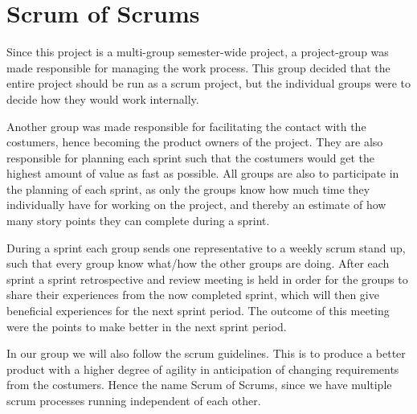 \section{Scrum of Scrums}
Since this project is a multi-group semester-wide project, a project-group was made responsible for managing the work process.
This group decided that the entire project should be run as a scrum project, but the individual groups were to decide how they would work internally.

Another group was made responsible for facilitating the contact with the costumers, hence becoming the product owners of the project.
They are also responsible for planning each sprint such that the costumers would get the highest amount of value as fast as possible.
All groups are also to participate in the planning of each sprint, as only the groups know how much time they individually have for working on the project, and thereby an estimate of how many story points they can complete during a sprint.

During a sprint each group sends one representative to a weekly scrum stand up, such that every group know what/how the other groups are doing.
After each sprint a sprint retrospective and review meeting is held in order for the groups to share their experiences from the now completed sprint, which will then give beneficial experiences for the next sprint period.
The outcome of this meeting were the points to make better in the next sprint period.

In our group we will also follow the scrum guidelines. This is to produce a better product with a higher degree of agility in anticipation of changing requirements from the costumers.
Hence the name Scrum of Scrums, since we have multiple scrum processes running independent of each other.
